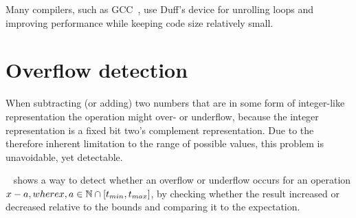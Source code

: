 Many compilers, such as GCC~\cite{gcc}, use Duff's device for unrolling loops and improving performance while keeping code size relatively small.



\newpage

\section{Overflow detection}\label{sec:basics:overflow}

When subtracting (or adding) two numbers that are in some form of integer-like representation the operation might over- or underflow, because the integer representation is a fixed bit two's complement representation.
Due to the therefore inherent limitation to the range of possible values, this problem is unavoidable, yet detectable.

~\cite{pmg_2009} shows a way to detect whether an overflow or underflow occurs for an operation $x - a, where x, a \in \mathbb{N} \cap {\lbrack t_{min}, t_{max} \rbrack}$, by checking whether the result increased or decreased relative to the bounds and comparing it to the expectation.


